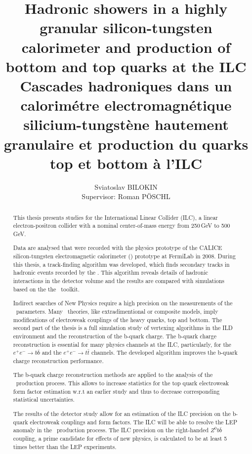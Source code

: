 \documentclass[a4paper, 12pt]{article}
\title{Hadronic showers in a highly granular silicon-tungsten calorimeter and production of bottom and top quarks at the ILC \\ Cascades hadroniques dans un calorim\'etre electromagn\'etique silicium-tungst\`ene hautement granulaire et production du quarks top et bottom \`a l'ILC}
\author{Sviatoslav BILOKIN\\Supervisor:  Roman P\"OSCHL}
\begin{document}
	

\renewcommand{\abstractname}{Abstract}
\begin{abstract}

This thesis presents studies for the International Linear Collider (ILC), a linear electron-positron collider with a nominal center-of-mass energy from 250\,GeV to 500\,GeV.

Data are analysed that were recorded with the physics prototype of the CALICE silicon-tungsten electromagnetic calorimeter (\ecal) prototype at FermiLab in 2008. During this thesis, a track-finding algorithm was developed, which finds secondary tracks in hadronic events recorded by the \ecalp. This algorithm reveals details of hadronic interactions in the detector volume and the results are compared with simulations based on the the \geant\ toolkit.

Indirect searches of New Physics require a high precision on the measurements of the \sm\ parameters. 
Many \bsm\ theories, like extradimentional or composite models, imply modifications of electroweak couplings of the heavy quarks, top and bottom. The second part of the thesis is a full simulation study of vertexing algorithms in the ILD environment and the reconstruction of the b-quark charge. The b-quark charge reconstruction is essential for many physics channels at the ILC, particularly, for the $e^+e^-\to b\bar{b}$ and the $e^+e^-\to t\bar{t}$ channels.
The developed algorithm improves the b-quark charge reconstruction performance.

The b-quark charge reconstruction methods are applied to the analysis of the \ttbar\ production process. This allows to increase statistics for the top quark electroweak form factor estimation w.r.t an earlier study and thus to decrease corresponding statistical uncertainties.

The results of the detector study allow for an estimation of the ILC precision on the b-quark electroweak couplings and form factors. The ILC will be able to resolve the LEP anomaly in the \bbbar\ production process. The ILC precision on the right-handed $Z^0b\bar{b}$ coupling, a prime candidate for effects of new physics, is calculated to be at least 5 times better than the LEP experiments. 
\end{abstract}
\end{document}
